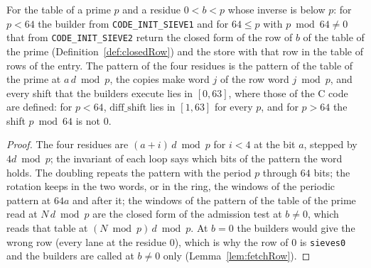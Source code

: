 \begin{lemma}\label{lem:primeRows}
  \leanok
  For the table of a prime $p$ and a residue $0 < b < p$ whose inverse is below $p$: for $p < 64$
  the builder from \verb|CODE_INIT_SIEVE1| and for $64 \le p$ with $p \bmod 64 \ne 0$ that from
  \verb|CODE_INIT_SIEVE2| return the closed form of the row of $b$ of the table of the prime
  (Definition~\ref{def:closedRow}) and the store with that row in the table of rows of the entry.
  The pattern of the four residues is the pattern of the table of the prime at $a\, d \bmod p$, the
  copies make word $j$ of the row word $j \bmod p$, and every shift that the builders execute lies
  in $[0, 63]$, where those of the C code are defined: for $p < 64$, $\mathrm{diff\_shift}$ lies in
  $[1, 63]$ for every $p$, and for $p > 64$ the shift $p \bmod 64$ is not $0$.
\end{lemma}

\begin{proof}
  \leanok
  The four residues are $(a + i)\, d \bmod p$ for $i < 4$ at the bit $a$, stepped by $4d \bmod p$;
  the invariant of each loop says which bits of the pattern the word holds. The doubling repeats the
  pattern with the period $p$ through $64$ bits; the rotation keeps in the two words, or in the
  ring, the windows of the periodic pattern at $64 a$ and after it; the windows of the pattern of
  the table of the prime read at $N\, d \bmod p$ are the closed form of the admission test at $b \ne
  0$, which reads that table at $(N \bmod p)\, d \bmod p$. At $b = 0$ the builders would give the
  wrong row (every lane at the residue $0$), which is why the row of $0$ is \verb|sieves0| and the
  builders are called at $b \ne 0$ only (Lemma~\ref{lem:fetchRow}).
\end{proof}

